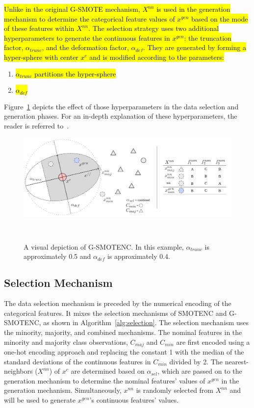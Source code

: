 \documentclass[preprint,12pt]{elsarticle}
\begin{document}
{\hl{Unlike in the original G-SMOTE mechanism, $X^{nn}$ is used in the generation
mechanism to determine the categorical feature values of $x^{gen}$ based on
the mode of these features within $X^{nn}$. The selection strategy uses two
additional hyperparameters to generate the continuous features in $x^{gen}$:
the truncation factor, $\alpha_{trunc}$, and the deformation factor,
$\alpha_{def}$. They are generated by forming a hyper-sphere with center
$x^c$ and is modified according to the parameters:}

\begin{enumerate}
    \item \hl{$\alpha_{trunc}$ partitions the hyper-sphere} 
    \item \hl{$\alpha_{def}$}
\end{enumerate}

Figure~\ref{fig:gsmote} depicts the effect of those hyperparameters in the
data selection and generation phases. For an in-depth explanation of these
hyperparameters, the reader is referred to~\cite{douzas2019geometric}.

\begin{figure}
	\centering
	\includegraphics[width=\linewidth]{../analysis/g-smote}
    \caption{A visual depiction of G-SMOTENC. In this example,
        $\alpha_{trunc}$ is approximately 0.5 and $\alpha_{def}$ is
        approximately 0.4.
    }~\label{fig:gsmote}
\end{figure}

\subsection{Selection Mechanism}

The data selection mechanism is preceded by the numerical encoding of the
categorical features. It mixes the selection mechanisms of SMOTENC and
G-SMOTENC, as shown in Algorithm~\ref{alg:selection}. The selection mechanism
uses the minority, majority, and combined mechanisms. The nominal features in
the minority and majority class observations, $C_{maj}$ and $C_{min}$ are
first encoded using a one-hot encoding approach and replacing the constant 1
with the median of the standard deviations of the continuous features in
$C_{min}$ divided by 2. The nearest-neighbors ($X^{nn}$) of $x^c$ are
determined based on $\alpha_{sel}$, which are passed on to the generation
mechanism to determine the nominal features' values of $x^{gen}$ in the
generation mechanism. Simultaneously, $x^{nn}$ is randomly selected from
$X^{nn}$ and will be used to generate $x^{gen}$'s continuous features' values.


}
\end{document}
